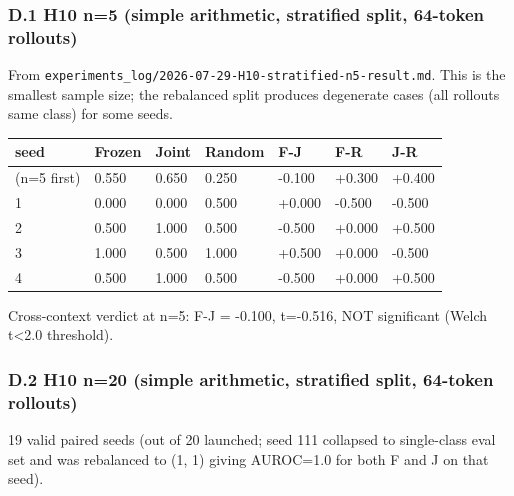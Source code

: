 \documentclass[11pt]{article}
\begin{document}
\subsubsection{D.1 H10 n=5 (simple arithmetic, stratified split,
64-token
rollouts)}\label{d.1-h10-n5-simple-arithmetic-stratified-split-64-token-rollouts}

From \texttt{experiments\_log/2026-07-29-H10-stratified-n5-result.md}.
This is the smallest sample size; the rebalanced split produces
degenerate cases (all rollouts same class) for some seeds.

{\def\LTcaptype{none} %
\begin{longtable}[]{@{}lllllll@{}}
\toprule\noalign{}
seed & Frozen & Joint & Random & F-J & F-R & J-R \\
\midrule\noalign{}
\endhead
\bottomrule\noalign{}
\endlastfoot
0 (n=5 first) & 0.550 & 0.650 & 0.250 & -0.100 & +0.300 & +0.400 \\
1 & 0.000 & 0.000 & 0.500 & +0.000 & -0.500 & -0.500 \\
2 & 0.500 & 1.000 & 0.500 & -0.500 & +0.000 & +0.500 \\
3 & 1.000 & 0.500 & 1.000 & +0.500 & +0.000 & -0.500 \\
4 & 0.500 & 1.000 & 0.500 & -0.500 & +0.000 & +0.500 \\
\end{longtable}
}

Cross-context verdict at n=5: F-J = -0.100, t=-0.516, NOT significant
(Welch t\textless2.0 threshold).

\subsubsection{D.2 H10 n=20 (simple arithmetic, stratified split,
64-token
rollouts)}\label{d.2-h10-n20-simple-arithmetic-stratified-split-64-token-rollouts}

19 valid paired seeds (out of 20 launched; seed 111 collapsed to
single-class eval set and was rebalanced to (1, 1) giving AUROC=1.0 for
both F and J on that seed).
\end{document}
